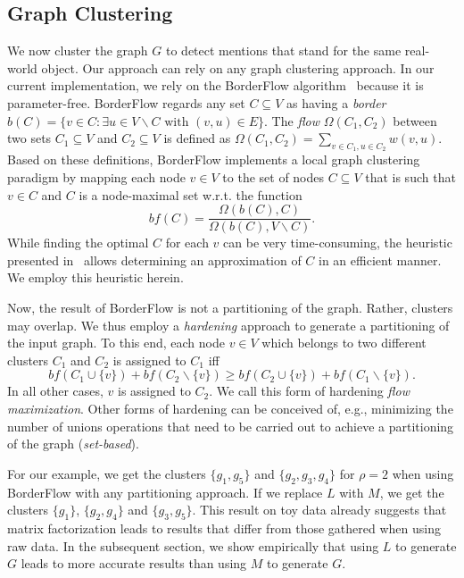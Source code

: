 \documentclass{llncs}
\begin{document}
\subsection{Graph Clustering}
We now cluster the graph $G$ to detect mentions that stand for the same real-world object.
Our approach can rely on any graph clustering approach.
In our current implementation, we rely on the BorderFlow algorithm~\cite{DBLP:conf/cicling/NgomoS09} because it is parameter-free.
BorderFlow regards any set $C \subseteq V$ as having a \emph{border} $b(C) = \{v \in C: \exists u \in V \backslash C \mbox{ with } (v, u) \in E\}$.
The \emph{flow} $\Omega(C_1, C_2)$ between two sets $C_1 \subseteq V$ and  $C_2 \subseteq V$ is defined as $\Omega(C_1, C_2) = \sum\limits_{v \in C_1, u \in C_2} w(v, u)$.
Based on these definitions, BorderFlow implements a local graph clustering paradigm by mapping each node $v \in V$ to the set of nodes $C \subseteq V$ that is such that $v \in C$ and $C$ is a node-maximal set w.r.t. the function 
\begin{equation}
bf(C) = \frac{\Omega(b(C), C)}{\Omega(b(C), V \backslash C)}.
\end{equation}
While finding the optimal $C$ for each $v$ can be very time-consuming, the heuristic presented in~\cite{DBLP:bibsonomy_NGO10b} allows determining an approximation of $C$ in an efficient manner.
We employ this heuristic herein.

Now, the result of BorderFlow is not a partitioning of the graph.
Rather, clusters may overlap.
We thus employ a \emph{hardening} approach to generate a partitioning of the input graph.
To this end, each node $v\in V$ which belongs to two different clusters $C_1$ and $C_2$ is assigned to $C_1$ iff
\begin{equation}
bf(C_1 \cup \{v\}) + bf(C_2 \backslash \{v\}) \geq bf(C_2 \cup \{v\}) + bf(C_1 \backslash \{v\}).
\end{equation}
In all other cases, $v$ is assigned to $C_2$.
We call this form of hardening \emph{flow maximization}.
Other forms of hardening can be conceived of, e.g., minimizing the number of unions operations that need to be carried out to achieve a partitioning of the graph (\emph{set-based}).

For our example, we get the clusters $\{g_1, g_5\}$ and $\{g_2, g_3, g_4\}$ for $\rho=2$ when using BorderFlow with any partitioning approach.
If we replace $L$ with $M$, we get the clusters  $\{g_1\}$, $\{g_2, g_4\}$ and $\{g_3, g_5\}$.
This result on toy data already suggests that matrix factorization leads to results that differ from those gathered when using raw data.
In the subsequent section, we show empirically that using $L$ to generate $G$ leads to more accurate results than using $M$ to generate $G$.
\end{document}

